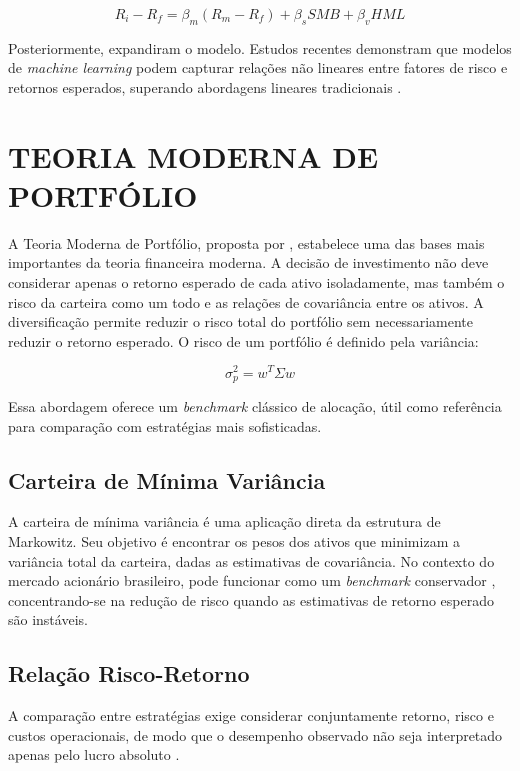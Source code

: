 \documentclass{eic-bcc-tcc}
\begin{document}
\begin{equation}
R_i - R_f = \beta_m (R_m - R_f) + \beta_s SMB + \beta_v HML
\end{equation}

Posteriormente, \citep{FamaFrench2015} expandiram o modelo. Estudos recentes demonstram que modelos de \textit{machine learning} podem capturar relações não lineares entre fatores de risco e retornos esperados, superando abordagens lineares tradicionais \citep{Gu2020}.

\section{TEORIA MODERNA DE PORTFÓLIO}

A Teoria Moderna de Portfólio, proposta por \citet{Markowitz1952}, estabelece uma das bases mais importantes da teoria financeira moderna. A decisão de investimento não deve considerar apenas o retorno esperado de cada ativo isoladamente, mas também o risco da carteira como um todo e as relações de covariância entre os ativos. A diversificação permite reduzir o risco total do portfólio sem necessariamente reduzir o retorno esperado. O risco de um portfólio é definido pela variância:

\begin{equation}
\sigma_p^2 = w^T \Sigma w
\end{equation}

Essa abordagem oferece um \textit{benchmark} clássico de alocação, útil como referência para comparação com estratégias mais sofisticadas.

\subsection{Carteira de Mínima Variância}
A carteira de mínima variância é uma aplicação direta da estrutura de Markowitz. Seu objetivo é encontrar os pesos dos ativos que minimizam a variância total da carteira, dadas as estimativas de covariância. No contexto do mercado acionário brasileiro, pode funcionar como um \textit{benchmark} conservador \citep{Clarke2006}, concentrando-se na redução de risco quando as estimativas de retorno esperado são instáveis.

\subsection{Relação Risco-Retorno}
A comparação entre estratégias exige considerar conjuntamente retorno, risco e custos operacionais, de modo que o desempenho observado não seja interpretado apenas pelo lucro absoluto \citep{LopezDePrado2018}.
\end{document}

